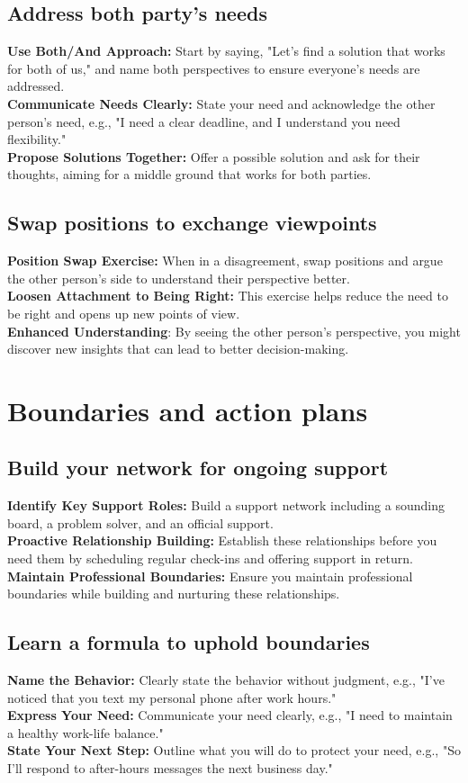 \documentclass[12pt]{article}
\begin{document}
\subsection{Address both party's needs}
\textbf{Use Both/And Approach:}  Start by saying, "Let's find a solution that works for both of us," and name both perspectives to ensure everyone's needs are addressed.\\
\textbf{Communicate Needs Clearly:}  State your need and acknowledge the other person's need, e.g., "I need a clear deadline, and I understand you need flexibility."\\
\textbf{Propose Solutions Together:}  Offer a possible solution and ask for their thoughts, aiming for a middle ground that works for both parties.

\subsection{Swap positions to exchange viewpoints}
\textbf{Position Swap Exercise:}  When in a disagreement, swap positions and argue the other person's side to understand their perspective better.\\
\textbf{Loosen Attachment to Being Right:} This exercise helps reduce the need to be right and opens up new points of view.\\
\textbf{Enhanced Understanding}: By seeing the other person's perspective, you might discover new insights that can lead to better decision-making.

\section{Boundaries and action plans}
\subsection{Build your network for ongoing support}
\textbf{Identify Key Support Roles:}  Build a support network including a sounding board, a problem solver, and an official support.\\
\textbf{Proactive Relationship Building:}  Establish these relationships before you need them by scheduling regular check-ins and offering support in return.\\
\textbf{Maintain Professional Boundaries:} Ensure you maintain professional boundaries while building and nurturing these relationships.

\subsection{Learn a formula to uphold boundaries}
\textbf{Name the Behavior:}  Clearly state the behavior without judgment, e.g., "I've noticed that you text my personal phone after work hours."\\
\textbf{Express Your Need:} Communicate your need clearly, e.g., "I need to maintain a healthy work-life balance."\\
\textbf{State Your Next Step:}  Outline what you will do to protect your need, e.g., "So I'll respond to after-hours messages the next business day."
\end{document}
